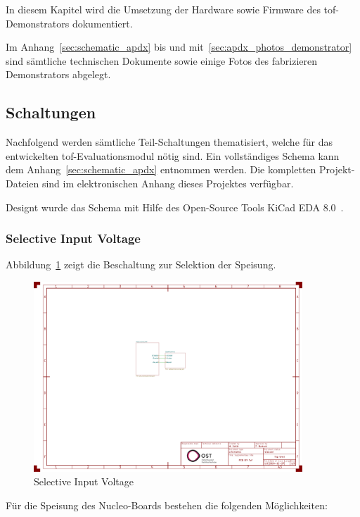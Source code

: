 In diesem Kapitel wird die Umsetzung der Hardware sowie Firmware des \acrshort{tof}-Demonstrators dokumentiert.

Im Anhang~\ref{sec:schematic_apdx} bis und mit~\ref{sec:apdx_photos_demonstrator} sind sämtliche technischen Dokumente
sowie einige Fotos des fabrizieren Demonstrators abgelegt.

\subsection{Schaltungen}
Nachfolgend werden sämtliche Teil-Schaltungen thematisiert, welche für das entwickelten \acrshort{tof}-Evaluationsmodul
nötig sind. Ein vollständiges Schema kann dem Anhang~\ref{sec:schematic_apdx} entnommen werden. Die kompletten
Projekt-Dateien sind im elektronischen Anhang dieses Projektes verfügbar.

Designt wurde das Schema mit Hilfe des Open-Source Tools \dq KiCad EDA 8.0\dq\ \cite{kicad2025kicadeda}.

\subsubsection{Selective Input Voltage}

Abbildung~\ref{fig:selective_input_voltage} zeigt die Beschaltung zur Selektion der Speisung.

\begin{figure}[H]
    \centering
    \includegraphics[page=2, trim=80 590 750 50, clip, width=0.9\textwidth]{attachments/schematic.pdf}
    \caption{Selective Input Voltage}\label{fig:selective_input_voltage}
\end{figure}

Für die Speisung des Nucleo-Boards bestehen die folgenden Möglichkeiten:

